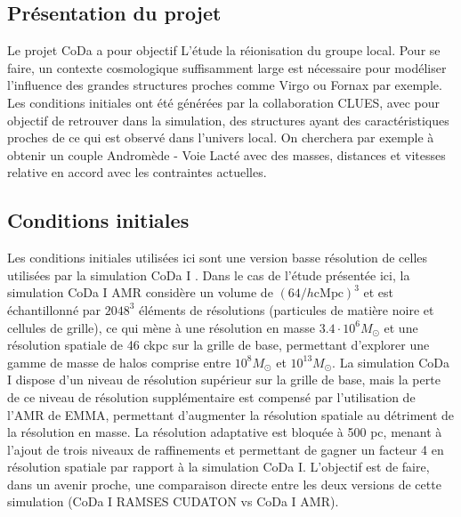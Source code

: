\subsection{Présentation du projet}

Le projet \ac{CoDa} a pour objectif L’étude la réionisation du groupe local. %
Pour se faire, un contexte cosmologique suffisamment large est nécessaire pour modéliser l'influence des grandes structures proches comme Virgo ou Fornax par exemple.
Les conditions initiales ont été générées par la collaboration \ac{CLUES}, avec pour objectif de retrouver dans la simulation, des structures ayant des caractéristiques proches de ce qui est observé dans l'univers local.
On cherchera par exemple à obtenir un couple Andromède - Voie Lacté avec des masses, distances et vitesses relative en accord avec les contraintes actuelles.

\subsection{Conditions initiales}
\label{sec:ICCODA}
Les conditions initiales utilisées ici sont une version basse résolution de celles utilisées par la simulation \ac{CoDa} I \citep{ocvirk_cosmic_2015}.
Dans le cas de l'étude présentée ici, la simulation \ac{CoDa} I AMR considère un volume de $\left( 64/h \mathrm{cMpc} \right)^3$ et est échantillonné par $2048^3$ éléments de résolutions (particules de matière noire et cellules de grille), ce qui mène à une résolution en masse $3.4 \cdot 10^6 M_\odot$ et une résolution spatiale de 46 ckpc sur la grille de base, permettant d'explorer une gamme de masse de halos comprise entre $10^8 M_\odot$ et $10^{13}M_\odot$.
La simulation \ac{CoDa} I dispose d'un niveau de résolution supérieur sur la grille de base, mais la perte de ce niveau de résolution supplémentaire est compensé par l'utilisation de l'\ac{AMR} de EMMA, permettant d’augmenter la résolution spatiale au détriment de la résolution en masse.
La résolution adaptative est bloquée à 500 pc, menant à l'ajout de trois niveaux de raffinements et permettant de gagner un facteur 4 en résolution spatiale par rapport à la simulation  \ac{CoDa} I.
L'objectif est de faire, dans un avenir proche, une comparaison directe entre les deux versions de cette simulation (CoDa I RAMSES CUDATON vs CoDa I AMR).

